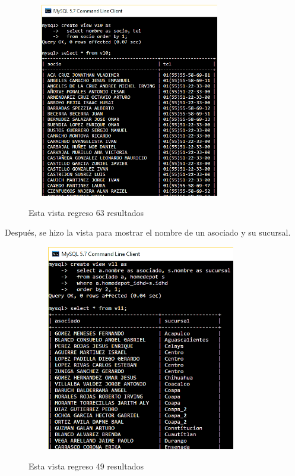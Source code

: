 \documentclass[12pt, titlepage]{article}
\begin{document}
	\begin{figure}[H]
		\begin{center}
			\includegraphics[width=9cm, height=8.5cm]{img/v10.png}
			\label{fig:10}
			\caption{Esta vista regreso 63 resultados}
		\end{center}
	\end{figure}
	Después, se hizo la vista para mostrar el nombre de un asociado y su sucursal.
	\begin{figure}[H]
		\begin{center}
			\includegraphics[width=10cm, height=9cm]{img/v11.png}
			\label{fig:11}
			\caption{Esta vista regreso 49 resultados}
		\end{center}
	\end{figure}
	
\end{document}
